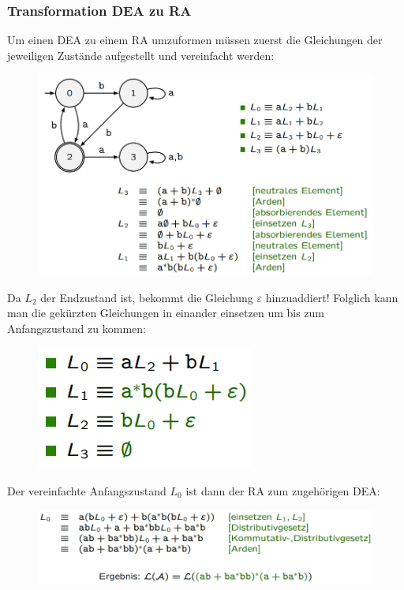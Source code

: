 \documentclass[12pt,a4paper]{article}
\begin{document}
	\subsubsection{Transformation DEA zu RA}
	Um einen DEA zu einem RA umzuformen müssen zuerst die Gleichungen der jeweiligen Zustände aufgestellt und vereinfacht werden:\newline
	\begin{center}
		\begin{figure}[!h]
			\includegraphics[width=\textwidth]{Bilder/DEAzuRA1.png}
		\end{figure}
	\end{center}
	Da $L_2$ der Endzustand ist, bekommt die Gleichung $\varepsilon$ hinzuaddiert!\newline
	Folglich kann man die gekürzten Gleichungen in einander einsetzen um bis zum Anfangszustand zu kommen:\newline
	\begin{center}
		\begin{figure}[!h]
			\includegraphics[]{Bilder/DEAzuRA2.png}
		\end{figure}
	\end{center}
	Der vereinfachte Anfangszustand $L_0$ ist dann der RA zum zugehörigen DEA:\newline
	\begin{center}
		\begin{figure}[!h]
			\includegraphics[width=\textwidth]{Bilder/DEAzuRA3.png}
		\end{figure}
	\end{center}
\end{document}
